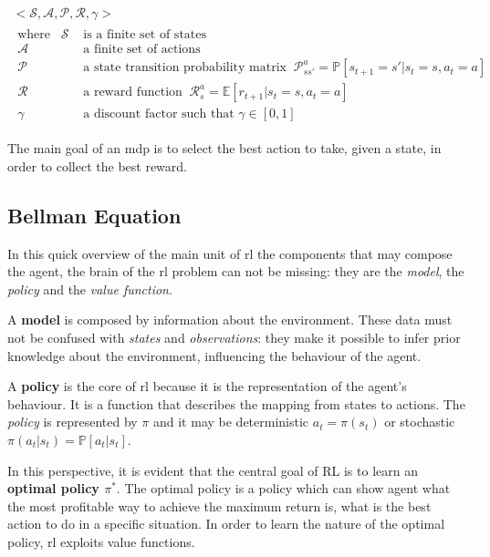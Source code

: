  \begin{equation}\label{eq:mdp}
 \begin{gathered} 
 <\mathcal{S}, \mathcal{A}, \mathcal{P}, \mathcal{R}, \gamma>\\
 \begin{aligned}
 	\text{where}\hspace{10pt} \mathcal{S} & \text{ is a finite set of states} \\
 	\mathcal{A} & \text{ a finite set of actions} \\
 	\mathcal{P} & \text{ a state transition probability matrix}\;\;
 	 \mathcal{P}_{ss'}^a = \mathbb{P}[s_{t+1}= s' | s_t = s, a_t = a]\\
 	\mathcal{R} & \text{ a reward function}
 	 	\;\; \mathcal{R}_{s}^a = \mathbb{E}[r_{t+1} | s_t = s, a_t = a] \\
 	 \gamma & \text{ a discount factor such that } \gamma \in [0,1]
 \end{aligned}
 \end{gathered}
 \end{equation}


The main goal of an \gls{mdp} is to select the best action to take, given a state, in order to collect the best reward. 

\subsection{Bellman Equation}

In this quick overview of the main unit of \gls{rl} the components that may compose the agent, the brain of the \gls{rl} problem can not be missing: they are the \textit{model}, the \textit{policy} and the \textit{value function}.

A \textbf{model} is composed by information about the environment. These data must not be confused with \textit{states} and \textit{observations}: they make it possible to infer prior knowledge about the environment, influencing the behaviour of the agent.

A \textbf{policy} is the core of \gls{rl} because it is the representation of the agent's behaviour. It is a function that describes the mapping from states to actions.  The \textit{policy} is represented by $\pi$ and it may be deterministic  $a_t = \pi(s_t)$  or stochastic $\pi(a_t|s_t) = \mathbb{P}[a_t | s_t]$.

In this perspective, it is evident that the central goal of RL is to learn an \textbf{optimal policy $\pi^*$}. The optimal policy is a policy which can show agent what the most profitable way to achieve the maximum return is, what is the best action to do in a specific situation. In order to learn the nature of the optimal policy, \gls{rl} exploits value functions.

